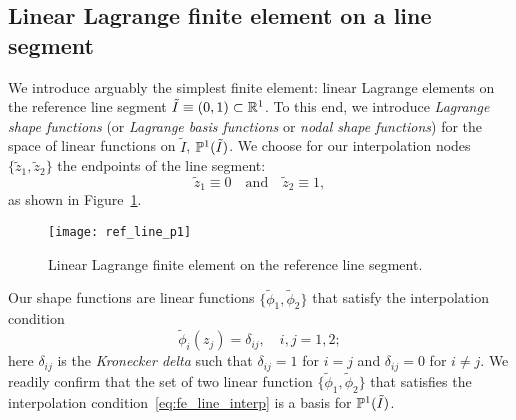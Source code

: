 \subsection{Linear Lagrange finite element on a line segment}
\label{sec:fe_lin_line}
We introduce arguably the simplest finite element: linear Lagrange elements on the reference line segment $\tilde I \equiv (0,1) \subset \mathbb{R}^1$.  To this end, we introduce \emph{Lagrange shape functions} (or \emph{Lagrange basis functions} or \emph{nodal shape functions}) for the space of linear functions on $\tilde I$, $\mathbb{P}^1(\tilde I)$.
We choose for our interpolation nodes $\{\tilde z_1, \tilde z_2\}$ the endpoints of the line segment:
\begin{equation*}
  \tilde z_1 \equiv 0 \quad \text{and} \quad \tilde z_2 \equiv 1,
\end{equation*}
as shown in Figure~\ref{fig:fe_ref_line_p1}.
  \begin{figure}
    \centering
    \texttt{[image: ref\_line\_p1]}
    \caption{Linear Lagrange finite element on the reference line segment.}
    \label{fig:fe_ref_line_p1}
\end{figure}
Our shape functions are linear functions $\{\tilde \phi_1, \tilde \phi_2\}$ that satisfy the interpolation condition
\begin{equation}
  \tilde \phi_i(z_j) = \delta_{ij}, \quad i,j = 1,2;  \label{eq:fe_line_interp}
\end{equation}
here $\delta_{ij}$ is the \emph{Kronecker delta} such that $\delta_{ij} = 1$ for $i = j$ and $\delta_{ij} = 0$ for $i \neq j$. We readily confirm that the set of two linear function $\{\tilde \phi_1,\tilde \phi_2\}$ that satisfies the interpolation condition~\eqref{eq:fe_line_interp} is a basis for $\mathbb{P}^1(\tilde I)$.

